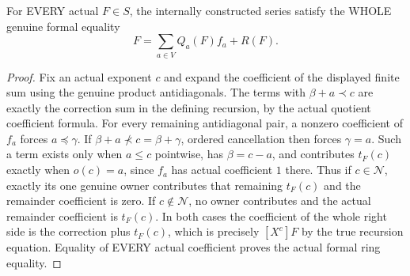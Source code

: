\begin{theorem}
\label{hir:actual-formal-vertex-division-identity}
For EVERY actual $F\in S$, the internally constructed series satisfy the
WHOLE genuine formal equality
\[
 F=\sum_{a\in V} Q_a(F)f_a+R(F).
\]
\leanok
\end{theorem}
\begin{proof}
Fix an actual exponent $c$ and expand the coefficient of the displayed
finite sum using the genuine product antidiagonals. The terms with
$\beta+a\prec c$ are exactly the correction sum in the defining
recursion, by the actual quotient coefficient formula.
For every remaining antidiagonal pair, a nonzero coefficient of $f_a$
forces $a\preceq\gamma$. If $\beta+a\not\prec c=\beta+\gamma$,
ordered cancellation then forces $\gamma=a$. Such a term exists only
when $a\le c$ pointwise, has $\beta=c-a$, and contributes $t_F(c)$
exactly when $o(c)=a$, since $f_a$ has actual coefficient $1$ there.
Thus if $c\in\mathcal N$, exactly its one genuine owner contributes
that remaining $t_F(c)$ and the remainder coefficient is zero. If
$c\notin\mathcal N$, no owner contributes and the actual remainder
coefficient is $t_F(c)$. In both cases the coefficient of the whole right
side is the correction plus $t_F(c)$, which is precisely $[X^c]F$
by the true recursion equation. Equality of EVERY actual coefficient
proves the actual formal ring equality.
\end{proof}

